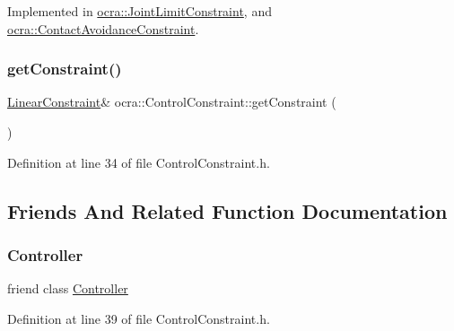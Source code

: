 Implemented in \hyperlink{classocra_1_1JointLimitConstraint_a5f91d3b746f76f17f71a03b68de1f8ee}{ocra\+::\+Joint\+Limit\+Constraint}, and \hyperlink{classocra_1_1ContactAvoidanceConstraint_a884358568ff7f5510d26ff96915a4d8c}{ocra\+::\+Contact\+Avoidance\+Constraint}.

\hypertarget{classocra_1_1ControlConstraint_a41b7568bc59441ca8d115e7ccf613658}{}\label{classocra_1_1ControlConstraint_a41b7568bc59441ca8d115e7ccf613658} 
\subsubsection{\texorpdfstring{get\+Constraint()}{getConstraint()}}
{\footnotesize\ttfamily \hyperlink{namespaceocra_ae8b87cf4099be3efc3b410019ad2046e}{Linear\+Constraint}\& ocra\+::\+Control\+Constraint\+::get\+Constraint (\begin{DoxyParamCaption}{ }\end{DoxyParamCaption})\hspace{0.3cm}{\ttfamily [inline]}}



Definition at line 34 of file Control\+Constraint.\+h.



\subsection{Friends And Related Function Documentation}
\hypertarget{classocra_1_1ControlConstraint_ac3456fd331a58b288082abca310c7a99}{}\label{classocra_1_1ControlConstraint_ac3456fd331a58b288082abca310c7a99} 
\subsubsection{\texorpdfstring{Controller}{Controller}}
{\footnotesize\ttfamily friend class \hyperlink{classocra_1_1Controller}{Controller}\hspace{0.3cm}{\ttfamily [friend]}}



Definition at line 39 of file Control\+Constraint.\+h.



